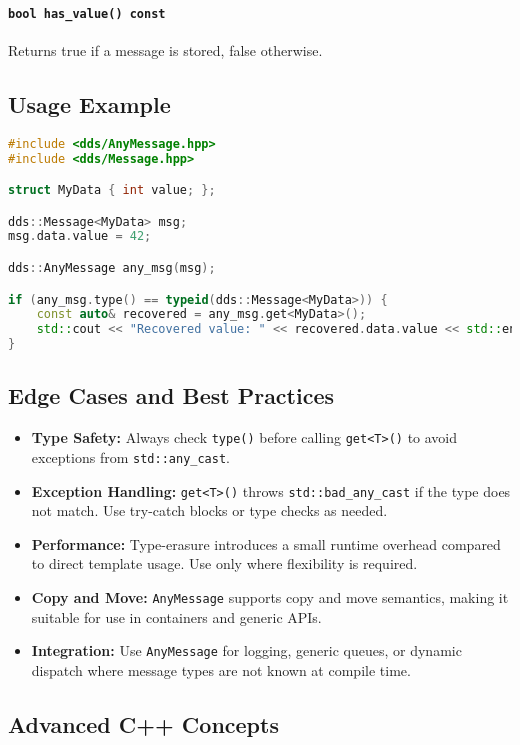 \documentclass[12pt]{report}
\begin{document}
\paragraph{\texttt{bool has\_value() const}}
Returns true if a message is stored, false otherwise.

\subsection{Usage Example}
\begin{lstlisting}[language=C++]
#include <dds/AnyMessage.hpp>
#include <dds/Message.hpp>

struct MyData { int value; };

dds::Message<MyData> msg;
msg.data.value = 42;

dds::AnyMessage any_msg(msg);

if (any_msg.type() == typeid(dds::Message<MyData>)) {
    const auto& recovered = any_msg.get<MyData>();
    std::cout << "Recovered value: " << recovered.data.value << std::endl;
}
\end{lstlisting}

\subsection{Edge Cases and Best Practices}
\begin{itemize}
    \item \textbf{Type Safety:} Always check \texttt{type()} before calling \texttt{get<T>()} to avoid exceptions from \texttt{std::any\_cast}.
    \item \textbf{Exception Handling:} \texttt{get<T>()} throws \texttt{std::bad\_any\_cast} if the type does not match. Use try-catch blocks or type checks as needed.
    \item \textbf{Performance:} Type-erasure introduces a small runtime overhead compared to direct template usage. Use only where flexibility is required.
    \item \textbf{Copy and Move:} \texttt{AnyMessage} supports copy and move semantics, making it suitable for use in containers and generic APIs.
    \item \textbf{Integration:} Use \texttt{AnyMessage} for logging, generic queues, or dynamic dispatch where message types are not known at compile time.
\end{itemize}

\subsection{Advanced C++ Concepts}
\end{document}
